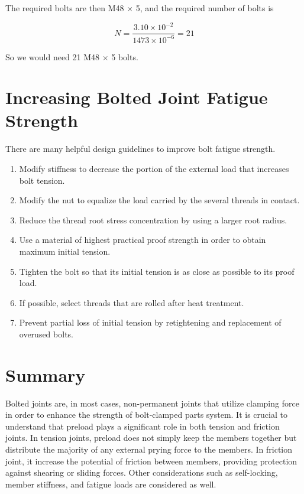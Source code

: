 \documentclass[a4paper,openany,12pt]{book}
\begin{document}
{{The required bolts are then M48 \(\times\) 5, and the required number of
bolts is

$$N = \frac{3.10 \times 10^{-2}}{1473 \times 10^{-6}} = 21$$

So we would need 21 M48 \(\times\) 5 bolts.

\section{Increasing Bolted Joint Fatigue Strength}
\label{sec:org467b884}
There are many helpful design guidelines to improve bolt fatigue
strength.

\begin{enumerate}
\item Modify stiffness to decrease the portion of the external load that
increases bolt tension.

\item Modify the nut to equalize the load carried by the several threads in
contact.

\item Reduce the thread root stress concentration by using a larger root
radius.

\item Use a material of highest practical proof strength in order to obtain
maximum initial tension.

\item Tighten the bolt so that its initial tension is as close as possible
to its proof load.

\item If possible, select threads that are rolled after heat treatment.

\item Prevent partial loss of initial tension by retightening and
replacement of overused bolts.
\end{enumerate}

\section{Summary}
\label{sec:org42a232e}
Bolted joints are, in most cases, non-permanent joints that utilize
clamping force in order to enhance the strength of bolt-clamped parts
system. It is crucial to understand that preload plays a significant
role in both tension and friction joints. In tension joints, preload
does not simply keep the members together but distribute the majority of
any external prying force to the members. In friction joint, it increase
the potential of friction between members, providing protection against
shearing or sliding forces. Other considerations such as self-locking,
member stiffness, and fatigue loads are considered as well.

}}
\end{document}
